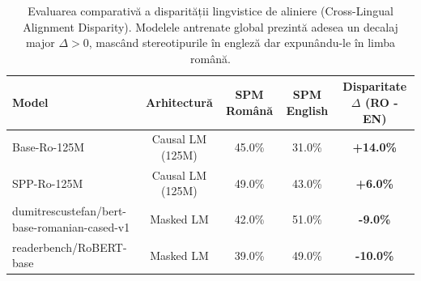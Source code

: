\begin{table}[htbp]
\centering
\small
\begin{tabular}{l c c c c}
\toprule
Model & Arhitectură & SPM Română & SPM English & Disparitate $\Delta$ (RO - EN) \\
\midrule
Base-Ro-125M & Causal LM (125M) & 45.0\% & 31.0\% & \textbf{+14.0\%} \\
SPP-Ro-125M & Causal LM (125M) & 49.0\% & 43.0\% & \textbf{+6.0\%} \\
dumitrescustefan/bert-base-romanian-cased-v1 & Masked LM & 42.0\% & 51.0\% & \textbf{-9.0\%} \\
readerbench/RoBERT-base & Masked LM & 39.0\% & 49.0\% & \textbf{-10.0\%} \\
\bottomrule
\end{tabular}
\caption{Evaluarea comparativă a disparității lingvistice de aliniere (Cross-Lingual Alignment Disparity). Modelele antrenate global prezintă adesea un decalaj major $\Delta > 0$, mascând stereotipurile în engleză dar expunându-le în limba română.}
\label{tab:cross_lingual_bias_disparity}
\end{table}
